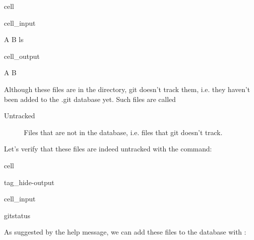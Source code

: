 \documentclass[a4paper,10pt,english]{jupyterBook}
\begin{document}
\begin{sphinxuseclass}{cell}\begin{sphinxVerbatimInput}

\begin{sphinxuseclass}{cell_input}
\begin{sphinxVerbatim}[commandchars=\\\{\}]
\PYGZgt{}A
\PYGZgt{}B
ls
\end{sphinxVerbatim}

\end{sphinxuseclass}\end{sphinxVerbatimInput}
\begin{sphinxVerbatimOutput}

\begin{sphinxuseclass}{cell_output}
\begin{sphinxVerbatim}[commandchars=\\\{\}]
A  B
\end{sphinxVerbatim}

\end{sphinxuseclass}\end{sphinxVerbatimOutput}

\end{sphinxuseclass}
\sphinxAtStartPar
Although these files are in the directory, git doesn’t track them, i.e. they haven’t been added to the .git database yet. Such files are called 
\begin{description}
\item[{Untracked}] \leavevmode
\sphinxAtStartPar
Files that are not in the  database, i.e. files that git doesn’t track.

\end{description}

\sphinxAtStartPar
Let’s verify that these files are indeed untracked with the  command:

\begin{sphinxuseclass}{cell}
\begin{sphinxuseclass}{tag_hide-output}\begin{sphinxVerbatimInput}

\begin{sphinxuseclass}{cell_input}
\begin{sphinxVerbatim}[commandchars=\\\{\}]
gitstatus
\end{sphinxVerbatim}

\end{sphinxuseclass}\end{sphinxVerbatimInput}

\end{sphinxuseclass}
\end{sphinxuseclass}
\sphinxAtStartPar
As suggested by the help message, we can add these files to the database with :
\end{document}
